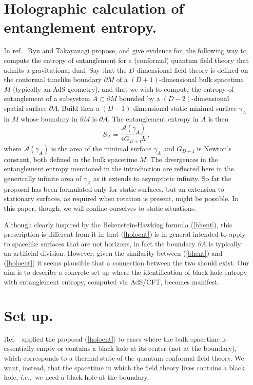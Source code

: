 \documentclass[12pt]{article}
\newcommand{\beq}{\begin{equation}}
\newcommand{\eeq}{\end{equation}}
\newcommand{\ie}{{\it i.e.,}\ }
\newcommand{\reef}[1]{(\ref{#1})}
\begin{document}
\section{Holographic calculation of entanglement entropy.} In
ref.~\cite{ryta} Ryu and Takayanagi propose, and give evidence for, the
following way to compute the entropy of entanglement for a (conformal)
quantum field theory that admits a gravitational dual. Say that the
$D$-dimensional field theory is defined on the conformal timelike
boundary $\partial M$ of a $(D+1)$-dimensional bulk spacetime $M$
(typically an AdS geometry), and that we wish to compute the entropy of
entanglement of a subsystem $A\subset \partial M$ bounded by a
$(D-2)$-dimensional spatial surface $\partial A$. Build then a
$(D-1)$-dimensional static minimal surface $\gamma_A$ in $M$ whose
boundary in $\partial M$ is $\partial A$. The entanglement entropy in
$A$ is then 
\beq
\label{holoent} S_A=\frac{\mathcal{A}(\gamma_A)}{4
G_{D+1} \hbar}\,, 
\eeq 
where $\mathcal{A}(\gamma_A)$ is the area of the
minimal surface $\gamma_A$ and $G_{D+1}$ is Newton's constant, both
defined in the bulk spacetime $M$. The divergences in the entanglement
entropy mentioned in the introduction are reflected here in the
generically infinite area of $\gamma_A$ as it extends to asymptotic
infinity. So far the proposal has been formulated only for static
surfaces, but an extension to stationary surfaces, as required when
rotation is present, might be possible. In this paper, though, we will
confine ourselves to static situations.

Although clearly inspired by the Bekenstein-Hawking formula
\reef{bhent}, this prescription is different from it in that
\reef{holoent} is in general intended to apply to spacelike surfaces
that are not horizons, in fact the boundary $\partial A$ is typically an
artificial division. However, given the similarity between \reef{bhent}
and \reef{holoent} it seems plausible that a connection between the two
should exist. Our aim is to describe a concrete set up where the
identification of black hole entropy with entanglement entropy, computed
via AdS/CFT, becomes manifest.


\section{Set up.} Ref.~\cite{ryta} applied the proposal
\reef{holoent} to cases where the bulk spacetime is essentially empty or
contains a black hole at its center (not at the boundary), which
corresponds to a thermal state of the quantum conformal field theory. We
want, instead, that the spacetime in which the field theory lives
contains a black hole, \ie we need a black hole at the boundary.
\end{document}
